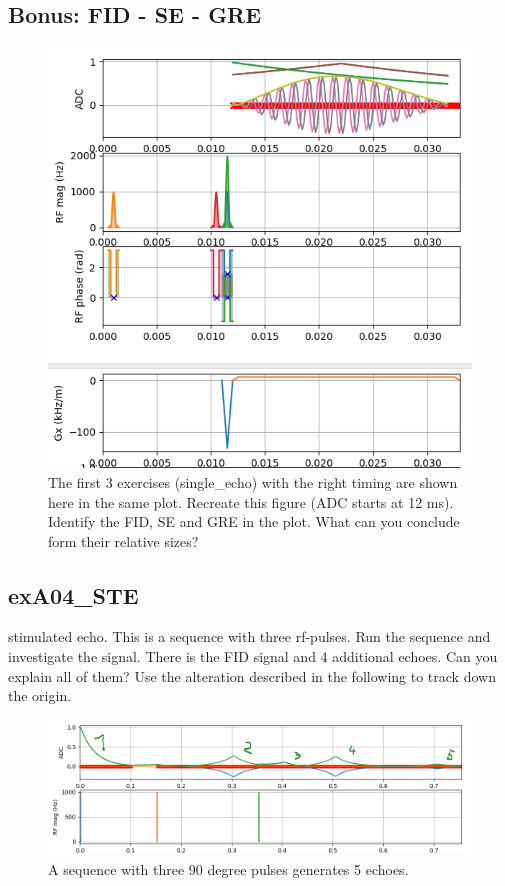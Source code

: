 \documentclass[a4paper,12pt]{extarticle}
\begin{document}
\subsection{Bonus: FID - SE - GRE}
\begin{figure}[H] 
\centering
\includegraphics[width=12cm]{img/exA_FID_SE_GRE.png}
\caption{The first 3 exercises (single\_echo) with the right timing are shown here in the same plot. Recreate this figure (ADC starts at 12 ms). Identify the FID, SE and GRE in the plot. What can you conclude form their relative sizes? } \label{fig:exA_FID_SE_GRE}
\end{figure}

\subsection{exA04\_STE}
stimulated echo.
This is a sequence with three rf-pulses. 
Run the sequence and  investigate the signal. There is the FID signal and 4 additional echoes. Can you explain all of them? Use the alteration described in the following to track down the origin.

\begin{figure}[H] 
\centering
\includegraphics[width=15cm]{img/exA4_STE_3pulses_5echoes.png}
\caption{A sequence with three 90 degree pulses generates 5 echoes. } \label{fig:exA4_STE}
\end{figure}
\end{document}
